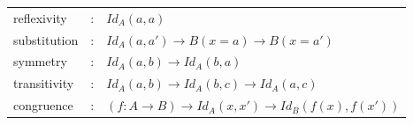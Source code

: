 \documentclass[11pt,oneside]{article}
\begin{document}
\begingroup
\parbox[t][][l]{0.40\textwidth}{

\begin{prooftree}
\end{prooftree}

\begin{prooftree}
\end{prooftree}

}
\hspace{0.1cm}
\parbox[t][][r]{0.60\textwidth}{

\begin{prooftree}
\end{prooftree}


\begin{prooftree}
\end{prooftree}

}
\endgroup

\begingroup
\parbox[t][][l]{0.40\textwidth}{

\begin{prooftree}
\end{prooftree}

}
\hspace{0.1cm}
\parbox[t][][r]{0.60\textwidth}{

}\endgroup


\begin{center}
\begin{tabular}{lll}
  reflexivity     &:& $Id_A(a,a)$ \\
  substitution    &:& $Id_A(a,a') \rightarrow B(x=a) \rightarrow B(x=a')$ \\
  symmetry        &:& $Id_A(a,b) \rightarrow Id_A(b,a)$  \\
  transitivity    &:& $Id_A(a,b) \rightarrow Id_A(b,c) \rightarrow Id_A(a,c)$ \\
  congruence      &:& $(f: A \rightarrow B) \rightarrow Id_A(x,x') \rightarrow Id_B(f(x),f(x'))$ \\
\end{tabular}
\end{center}
\end{document}
